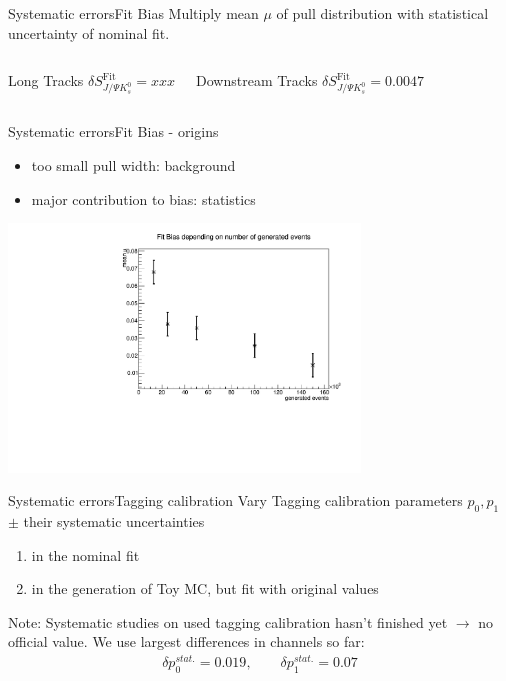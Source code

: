 \documentclass{beamer}
\newcommand{\SJPsi}{S_{J/\Psi K_s^0}}
\begin{document}
	\begin{frame}{Systematic errors}{Fit Bias}
	Multiply mean $\mu$ of pull distribution with statistical uncertainty of nominal fit.
	\begin{columns}
	\begin{block}{Long Tracks}
    \centering
        $\delta\SJPsi^{\text{Fit}} = xxx$
    \end{block}
	\begin{block}{Downstream Tracks}
    \centering
        $\delta\SJPsi^{\text{Fit}} = 0.0047$
    \end{block}
    \end{columns}
    \end{frame}
	
	\begin{frame}{Systematic errors}{Fit Bias - origins}
    \begin{itemize}
    \item too small pull width: background
    \item major contribution to bias: statistics
    \end{itemize}
    \begin{center}
    \includegraphics[width = 0.7\textwidth]{fit_bias_statistics}
    \end{center}
    \end{frame}
	
	\begin{frame}{Systematic errors}{Tagging calibration}
	Vary Tagging calibration parameters $p_0, p_1$ $\pm$ their systematic uncertainties
	\begin{enumerate}
	\item in the nominal fit
	\item in the generation of Toy MC, but fit with original values
	\end{enumerate}
	\begin{alert}{Note:}
	Systematic studies on used tagging calibration hasn't finished yet $\longrightarrow$ no official value. We use largest differences in channels so far:
	\begin{align*}
	\delta p_0^{stat.} = 0.019, \qquad \delta p_1^{stat.} = 0.07
	\end{align*}
	\end{alert}
	\end{frame}
	
\end{document}
